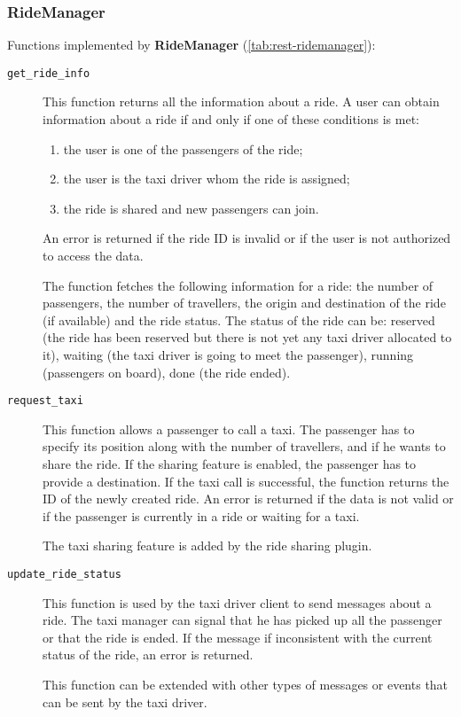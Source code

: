 \subsubsection{RideManager}
Functions implemented by \textbf{RideManager} (\autoref{tab:rest-ridemanager}):
\begin{description}
    \item[\texttt{get\_ride\_info}] This function returns all the information about a ride. A user can obtain information about a ride if and only if one of these conditions is met:
    \begin{enumerate}
        \item the user is one of the passengers of the ride;
        \item the user is the taxi driver whom the ride is assigned;
        \item the ride is shared and new passengers can join.
    \end{enumerate}
    An error is returned if the ride ID is invalid or if the user is not authorized to access the data.

    The function fetches the following information for a ride: the number of passengers, the number of travellers, the origin and destination of the ride (if available) and the ride status. The status of the ride can be: reserved (the ride has been reserved but there is not yet any taxi driver allocated to it), waiting (the taxi driver is going to meet the passenger), running (passengers on board), done (the ride ended).

    \item[\texttt{request\_taxi}] This function allows a passenger to call a taxi. The passenger has to specify its position along with the number of travellers, and if he wants to share the ride. If the sharing feature is enabled, the passenger has to provide a destination. If the taxi call is successful, the function returns the ID of the newly created ride. An error is returned if the data is not valid or if the passenger is currently in a ride or waiting for a taxi.

    The taxi sharing feature is added by the ride sharing plugin.

    \item[\texttt{update\_ride\_status}] This function is used by the taxi driver client to send messages about a ride. The taxi manager can signal that he has picked up all the passenger or that the ride is ended. If the message if inconsistent with the current status of the ride, an error is returned.

    This function can be extended with other types of messages or events that can be sent by the taxi driver.
\end{description}


